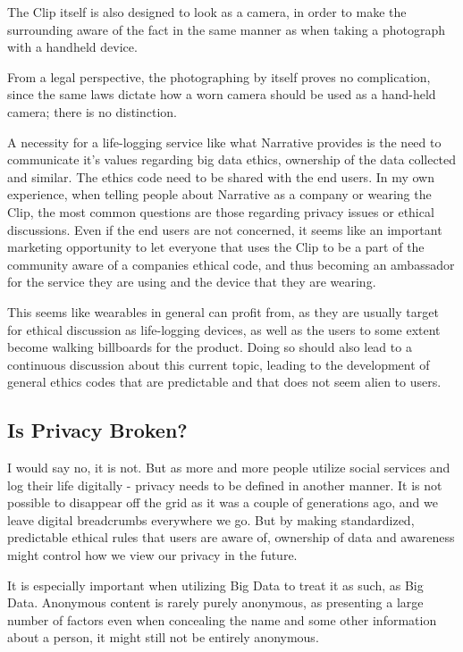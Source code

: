 The Clip itself is also designed to look as a camera, in order to
make the surrounding aware of the fact in the same manner as when
taking a photograph with a handheld device.

From a legal perspective, the photographing by itself proves no 
complication, since the same laws dictate how a worn camera should be 
used as a hand-held camera; there is no distinction.

A necessity for a life-logging service like what Narrative provides is the
need to communicate it's values regarding big data ethics, ownership
of the data collected and similar. The ethics code need to be shared 
with the end users. In my own experience, when telling people about 
Narrative as a company or wearing the Clip, the most common questions
are those regarding privacy issues or ethical discussions. Even if 
the end users are not concerned, it seems like an important marketing 
opportunity to let everyone that uses the Clip to be a part of the 
community aware of a companies ethical code, and thus becoming an 
ambassador for the service they are using and the device that they are
wearing. 

This seems like wearables in general can profit from, as they are 
usually target for ethical discussion as life-logging devices, as well
as the users to some extent become walking billboards for the product. 
Doing so should also lead to a continuous discussion about this current
topic, leading to the development of general ethics codes that are
predictable and that does not seem alien to users.

\subsection{Is Privacy Broken?}
I would say no, it is not. But as more and more people utilize social
services and log their life digitally - privacy needs to be defined in
another manner. It is not possible to disappear off the grid as it 
was a couple of generations ago, and we leave digital breadcrumbs 
everywhere we go. But by making standardized, predictable ethical rules
that users are aware of, ownership of data and awareness might control
how we view our privacy in the future. 

It is especially important when utilizing Big Data to treat it as 
such, as Big Data. Anonymous content is rarely purely anonymous, as 
presenting a large number of factors even when concealing the name and
some other information about a person, it might still not be entirely
anonymous.

